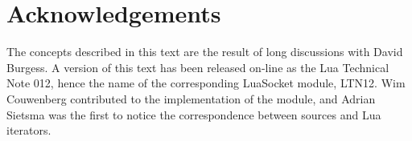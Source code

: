 \documentclass[10pt]{article}
\begin{document}
\section{Acknowledgements}

The concepts described in this text are the result of  long
discussions with David Burgess. A version of this text has
been released on-line as the Lua Technical Note 012, hence
the name of the corresponding LuaSocket module, LTN12.  Wim
Couwenberg contributed to the implementation of the module,
and Adrian Sietsma was the first to notice the
correspondence between sources and Lua iterators. 
\end{document}
